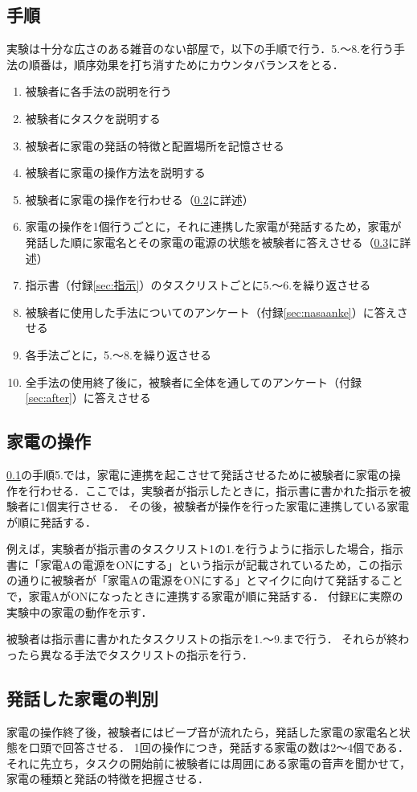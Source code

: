\documentclass[a4j,12pt,twoside]{jreport}
\begin{document}
\subsection{手順}
\label{sec:how}
実験は十分な広さのある雑音のない部屋で，以下の手順で行う．5.〜8.を行う手法の順番は，順序効果を打ち消すためにカウンタバランスをとる．
\begin{enumerate}
	\item 被験者に各手法の説明を行う
	\item 被験者にタスクを説明する
	\item 被験者に家電の発話の特徴と配置場所を記憶させる
	\item 被験者に家電の操作方法を説明する
	\item 被験者に家電の操作を行わせる（\ref{sec:操作}に詳述）
	\item 家電の操作を1個行うごとに，それに連携した家電が発話するため，家電が発話した順に家電名とその家電の電源の状態を被験者に答えさせる（\ref{sec:回答}に詳述）
	\item 指示書（付録\ref{sec:指示}）のタスクリストごとに5.〜6.を繰り返させる
	\item 被験者に使用した手法についてのアンケート（付録\ref{sec:nasaanke}）に答えさせる
	\item 各手法ごとに，5.〜8.を繰り返させる
	\item 全手法の使用終了後に，被験者に全体を通してのアンケート（付録\ref{sec:after}）に答えさせる
\end{enumerate}

\subsection{家電の操作}
\label{sec:操作}
\ref{sec:how}の手順5.では，家電に連携を起こさせて発話させるために被験者に家電の操作を行わせる．ここでは，実験者が指示したときに，指示書に書かれた指示を被験者に1個実行させる．
その後，被験者が操作を行った家電に連携している家電が順に発話する．

例えば，実験者が指示書のタスクリスト1の1.を行うように指示した場合，指示書に「家電Aの電源をONにする」という指示が記載されているため，この指示の通りに被験者が「家電Aの電源をONにする」とマイクに向けて発話することで，家電AがONになったときに連携する家電が順に発話する．
付録Eに実際の実験中の家電の動作を示す．

被験者は指示書に書かれたタスクリストの指示を1.〜9.まで行う．
それらが終わったら異なる手法でタスクリストの指示を行う．
\subsection{発話した家電の判別}
\label{sec:回答}
家電の操作終了後，被験者にはビープ音が流れたら，発話した家電の家電名と状態を口頭で回答させる．
1回の操作につき，発話する家電の数は2〜4個である．
それに先立ち，タスクの開始前に被験者には周囲にある家電の音声を聞かせて，家電の種類と発話の特徴を把握させる．
\end{document}
